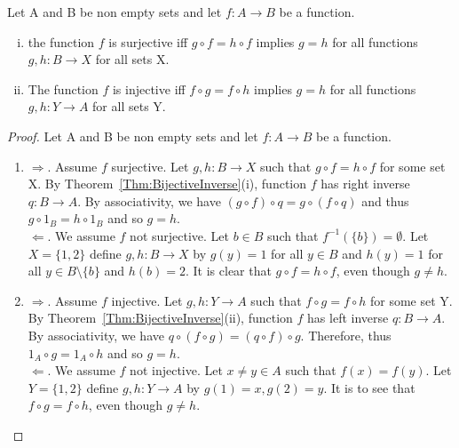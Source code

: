 \documentclass[a4paper,english,12pt]{article}   	%
\begin{document}
\begin{thm} Let A and B be non empty sets and let $f \colon A \to B$ be a function.
\begin{enumerate}[(i)]
\item the function $f$ is surjective iff $g \circ f = h \circ f$ implies $g=h$ for all functions $g,h \colon B \to X$ for all sets X.
\item The function $f$ is injective iff $f \circ g = f \circ h$ implies $g=h$ for all functions $g,h \colon Y \to A$ for all sets Y.
\end{enumerate}
\begin{proof} Let A and B be non empty sets and let $f \colon A \to B$ be a function.
\begin{enumerate}
\item $\Rightarrow$. Assume $f$ surjective. Let $g,h \colon B \to X$ such that $g \circ f = h \circ f$ for some set X. By Theorem~\ref{Thm:BijectiveInverse}(i), function $f$ has right inverse $q \colon B \to A$. By associativity, we have $(g \circ f) \circ q = g \circ (f \circ q)$ and thus $g \circ 1_{B} = h \circ 1_{B}$ and so $g=h$.\\
$\Leftarrow$. We assume $f$ not surjective. Let $b \in B$ such that $f^{-1}(\{b\})= \emptyset$. Let $X=\{1,2\}$ define $g,h \colon B \to X$ by $g(y)=1$ for all $y \in B$ and $h(y)=1$ for all $y \in B \setminus \{b\}$ and $h(b)=2$. It is clear that $g \circ f = h \circ f$, even though $g \neq h$.
\item $\Rightarrow$. Assume $f$ injective. Let $g,h \colon Y \to A$ such that $f \circ g = f \circ h$ for some set Y. By Theorem~\ref{Thm:BijectiveInverse}(ii), function $f$ has left inverse $q \colon B \to A$. By associativity, we have $ q \circ (f \circ g) = (q \circ f) \circ g$. Therefore, thus $1_{A} \circ g = 1_{A} \circ h$ and so $g=h$.\\
$\Leftarrow$. We assume $f$ not injective. Let $x \neq y \in A$ such that $f(x) = f(y)$. Let $Y = \{1,2\}$ define $g,h \colon Y \to A$ by $g(1) = x, g(2) = y$. It is to see that $f \circ g = f \circ h$, even though $g \neq h$.
\end{enumerate}
\end{proof}
\end{thm}
\end{document}
